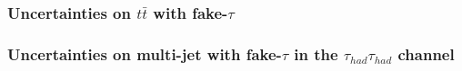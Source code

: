 \subsubsection{Uncertainties on $t\bar{t}$ with fake-$\tau$}
\label{subsec:LQ_uncertainties_ttbarfakes}


\subsubsection{Uncertainties on multi-jet with fake-$\tau$ in the $\tau_{had}\tau_{had}$ channel}
\label{subsec:LQ_uncertainties_hadhamultijetfakes}

